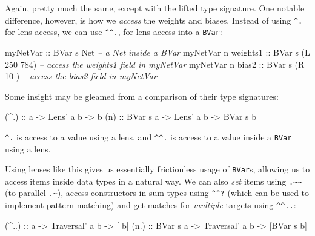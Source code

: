 \documentclass[]{article}
\newenvironment{Shaded}{}{}
\newcommand{\CommentTok}[1]{\textcolor[rgb]{0.38,0.63,0.69}{\textit{#1}}}
\newcommand{\DataTypeTok}[1]{\textcolor[rgb]{0.56,0.13,0.00}{#1}}
\newcommand{\DecValTok}[1]{\textcolor[rgb]{0.25,0.63,0.44}{#1}}
\newcommand{\FunctionTok}[1]{\textcolor[rgb]{0.02,0.16,0.49}{#1}}
\newcommand{\NormalTok}[1]{#1}
\newcommand{\OtherTok}[1]{\textcolor[rgb]{0.00,0.44,0.13}{#1}}
\begin{document}
Again, pretty much the same, except with the lifted type signature. One notable
difference, however, is how we \emph{access} the weights and biases. Instead of
using \texttt{\^{}.} for lens access, we can use \texttt{\^{}\^{}.}, for lens
access into a \texttt{BVar}:

\begin{Shaded}
\begin{Highlighting}[]
\OtherTok{myNetVar                ::} \DataTypeTok{BVar}\NormalTok{ s }\DataTypeTok{Net}          \CommentTok{-- a Net inside a BVar}
\NormalTok{myNetVar }\FunctionTok{^^.}\OtherTok{ weights1   ::} \DataTypeTok{BVar}\NormalTok{ s (}\DataTypeTok{L} \DecValTok{250} \DecValTok{784}\NormalTok{)  }\CommentTok{-- access the weights1 field in myNetVar}
\NormalTok{myNetVar }\FunctionTok{^^.}\OtherTok{ bias2      ::} \DataTypeTok{BVar}\NormalTok{ s (}\DataTypeTok{R}  \DecValTok{10}\NormalTok{    )  }\CommentTok{-- access the bias2 field in myNetVar}
\end{Highlighting}
\end{Shaded}

Some insight may be gleamed from a comparison of their type signatures:

\begin{Shaded}
\begin{Highlighting}[]
\OtherTok{(^.)  ::}\NormalTok{        a }\OtherTok{->} \DataTypeTok{Lens'}\NormalTok{ a b }\OtherTok{->}\NormalTok{        b}
\OtherTok{(^^.) ::} \DataTypeTok{BVar}\NormalTok{ s a }\OtherTok{->} \DataTypeTok{Lens'}\NormalTok{ a b }\OtherTok{->} \DataTypeTok{BVar}\NormalTok{ s b}
\end{Highlighting}
\end{Shaded}

\texttt{\^{}.} is access to a value using a lens, and \texttt{\^{}\^{}.} is
access to a value inside a \texttt{BVar} using a lens.

Using lenses like this gives us essentially frictionless usage of
\texttt{BVar}s, allowing us to access items inside data types in a natural way.
We can also \emph{set} items using \texttt{.\textasciitilde{}\textasciitilde{}}
(to parallel \texttt{.\textasciitilde{}}), access constructors in sum types
using \texttt{\^{}\^{}?} (which can be used to implement pattern matching) and
get matches for \emph{multiple} targets using \texttt{\^{}\^{}..}:

\begin{Shaded}
\begin{Highlighting}[]
\OtherTok{(^..)  ::}\NormalTok{        a }\OtherTok{->} \DataTypeTok{Traversal'}\NormalTok{ a b }\OtherTok{->}\NormalTok{ [       b]}
\OtherTok{(^^..) ::} \DataTypeTok{BVar}\NormalTok{ s a }\OtherTok{->} \DataTypeTok{Traversal'}\NormalTok{ a b }\OtherTok{->}\NormalTok{ [}\DataTypeTok{BVar}\NormalTok{ s b]}
\end{Highlighting}
\end{Shaded}
\end{document}
